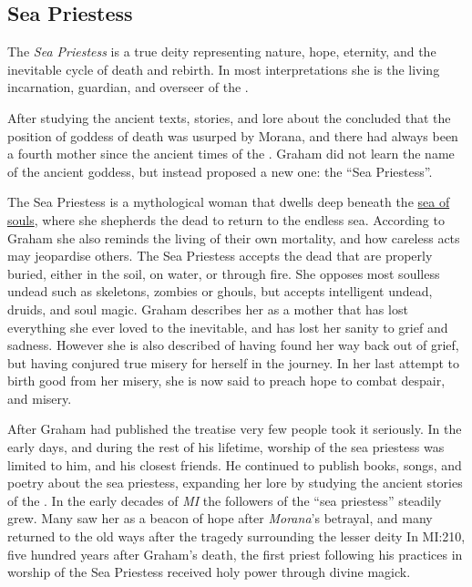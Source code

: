 \subsection{Sea Priestess}
\label{sec:Sea Priestess}


The \emph{Sea Priestess} is a true deity representing nature, hope, eternity,
and the inevitable cycle of death and rebirth. In most interpretations she
is the living incarnation, guardian, and overseer of the .

After studying the ancient texts, stories, and lore about the   concluded that the position of goddess of
death was usurped by Morana, and there had always been a fourth mother since
the ancient times of the . Graham did not learn the name of
the ancient goddess, but instead proposed a new one: the ``Sea Priestess''.

The Sea Priestess is a mythological woman that dwells deep beneath the
\hyperref[sec:Soul Well]{sea of souls}, where she shepherds the dead to
return to the endless sea. According to Graham she also reminds the living
of their own mortality, and how careless acts may jeopardise others. The Sea
Priestess accepts the dead that are properly buried, either in the soil, on
water, or through fire. She opposes most soulless undead such as skeletons,
zombies or ghouls, but accepts intelligent undead, druids, and soul
magic. Graham describes her as a mother that has lost everything she ever
loved to the inevitable, and has lost her sanity to grief and sadness. However
she is also described of having found her way back out of grief, but
having conjured true misery for herself in the journey. In her last attempt to
birth good from her misery, she is now said to preach hope to combat despair,
and misery.

After Graham had published the treatise very few people took it seriously. In
the early days, and during the rest of his lifetime, worship of the sea
priestess was limited to him, and his closest friends. He continued to publish
books, songs, and poetry about the sea priestess, expanding her lore by
studying the ancient stories of the . In the early
decades of \emph{MI} the followers of the ``sea priestess'' steadily grew.
Many saw her as a beacon of hope after \emph{Morana}'s betrayal, and many
returned to the old ways after the tragedy surrounding the lesser deity
 In MI:210, five hundred years after Graham's death, the
first priest following his practices in worship of the Sea Priestess received
holy power through divine magick.

